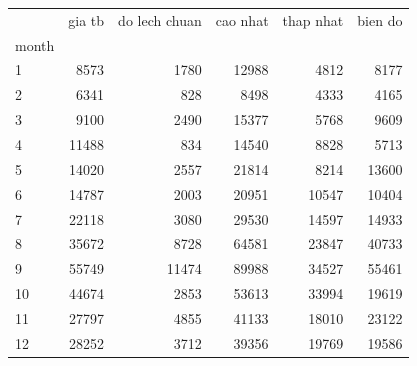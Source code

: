 \begin{tabular}{lrrrrr}
\toprule
 & gia tb & do lech chuan & cao nhat & thap nhat & bien do \\
month &  &  &  &  &  \\
\midrule
1 & 8573 & 1780 & 12988 & 4812 & 8177 \\
2 & 6341 & 828 & 8498 & 4333 & 4165 \\
3 & 9100 & 2490 & 15377 & 5768 & 9609 \\
4 & 11488 & 834 & 14540 & 8828 & 5713 \\
5 & 14020 & 2557 & 21814 & 8214 & 13600 \\
6 & 14787 & 2003 & 20951 & 10547 & 10404 \\
7 & 22118 & 3080 & 29530 & 14597 & 14933 \\
8 & 35672 & 8728 & 64581 & 23847 & 40733 \\
9 & 55749 & 11474 & 89988 & 34527 & 55461 \\
10 & 44674 & 2853 & 53613 & 33994 & 19619 \\
11 & 27797 & 4855 & 41133 & 18010 & 23122 \\
12 & 28252 & 3712 & 39356 & 19769 & 19586 \\
\bottomrule
\end{tabular}
